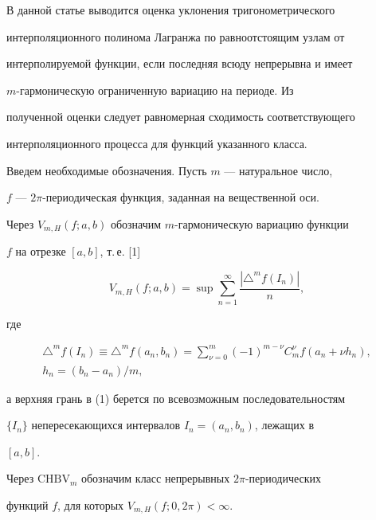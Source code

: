 \label{begin}





В данной статье выводится оценка уклонения тригонометрического


интерполяционного полинома Лагранжа по равноотстоящим узлам от 


интерполируемой функции, если последняя всюду непрерывна и имеет


$m$-гармоническую ограниченную вариацию на периоде. Из 


полученной оценки следует равномерная сходимость соответствующего 


интерполяционного процесса для функций указанного класса.





Введем необходимые обозначения. Пусть $m$ --- натуральное число,


$f$ --- $2\pi$-периодическая функция, заданная на вещественной оси.


Через $V_{m,H}(f;a,b)$ обозначим $m$-гармоническую вариацию функции


$f$ на отрезке $[a,b]$, т.\,е. [1]


\begin{equation}


V_{m,H}(f;a,b)=\sup\sum_{n=1}^{\infty}\frac{|\triangle^mf(I_n)|}n,


\end{equation}


где 


\begin{gather*}


\triangle^mf(I_n)\equiv\triangle^mf(a_n,b_n)=\sum_{\nu=0}^m


(-1)^{m-\nu}C_m^{\nu}f(a_n+\nu h_n),\\


h_n=(b_n-a_n)/m,


\end{gather*}


а верхняя грань в (1) берется по всевозможным последовательностям


$\{I_n\}$ непересекающихся интервалов $I_n=(a_n,b_n)$, лежащих в


$[a,b]$. 





Через $\mathrm{CHBV}_m$ обозначим класс непрерывных $2\pi$-периодических


функций $f$, для которых $V_{m,H}(f;0,2\pi)<\infty$.





